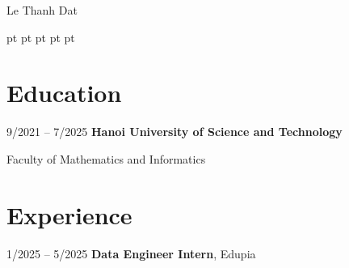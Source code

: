     \begin{header}
        \fontsize{25 pt}{25 pt}\selectfont Le Thanh Dat

        \vspace{5 pt}

        \normalsize
         pt%
        \mbox{}%
         pt%
        \AND%
         pt%
        \mbox{}%
         pt%
        \AND%
         pt%
        \mbox{}%
    \end{header}

    \vspace{5 pt - 0.3 cm}

\section{Education}
    \begin{twocolentry}{9/2021 – 7/2025}
        \textbf{Hanoi University of Science and Technology}
    \end{twocolentry}
    \vspace{0.10 cm}
    \begin{onecolentry}
        Faculty of Mathematics and Informatics
    \end{onecolentry}


\section{Experience}
    \begin{twocolentry}{1/2025 – 5/2025}
        \textbf{Data Engineer Intern}, Edupia
    \end{twocolentry}
\vspace{0.10 cm}

